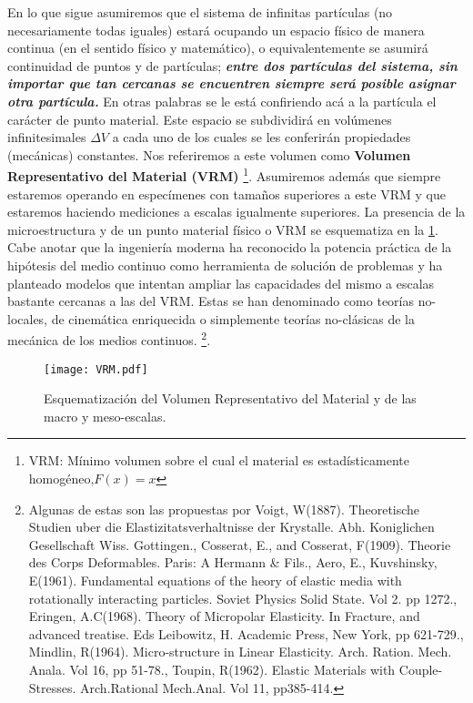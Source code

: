 \documentclass[../notas medios.tex]{subfiles}
\begin{document}
En lo que sigue asumiremos que el sistema de infinitas partículas (no
necesariamente todas iguales) estará ocupando un espacio físico de manera continua (en el sentido físico y matemático), o equivalentemente se asumirá continuidad de puntos y de partículas; \textbf{\textit{entre dos partículas del sistema, sin importar que tan cercanas se encuentren siempre será posible asignar otra partícula.}} En otras palabras se le está confiriendo acá a la partícula el carácter de punto material.  Este espacio se subdividirá en volúmenes infinitesimales $\Delta V$ a cada uno de los cuales se les conferirán propiedades (mecánicas) constantes.  Nos referiremos a este volumen como \textbf{Volumen Representativo del Material  (VRM)} \footnote{VRM: Mínimo volumen sobre el cual el material es estadísticamente homogéneo,$F(x)=x$}.  Asumiremos además que siempre estaremos operando en especímenes con tamaños superiores a este VRM y que estaremos haciendo mediciones a escalas igualmente superiores.  La presencia de la microestructura y de un punto material físico o VRM se esquematiza en la \cref{VRM}.  Cabe anotar que la ingeniería moderna ha reconocido la potencia práctica de la hipótesis del medio continuo como herramienta de solución de problemas y ha planteado modelos que intentan ampliar las capacidades del mismo a escalas bastante cercanas a las del VRM.  Estas se han denominado como teorías no-locales, de cinemática enriquecida o simplemente teorías no-clásicas de la mecánica de los medios continuos. \footnote{Algunas de estas son las propuestas por Voigt, W(1887).  Theoretische Studien uber die Elastizitatsverhaltnisse der Krystalle.  Abh. Koniglichen Gesellschaft Wiss.  Gottingen., Cosserat, E., and Cosserat, F(1909).  Theorie des Corps Deformables.  Paris: A Hermann \& Fils., Aero, E., Kuvshinsky, E(1961).  Fundamental equations of the heory of elastic media with rotationally interacting particles.  Soviet Physics Solid State.  Vol 2.  pp 1272., Eringen, A.C(1968).  Theory of Micropolar Elasticity.  In Fracture, and advanced treatise.  Eds Leibowitz, H.  Academic Press, New York, pp 621-729., Mindlin, R(1964).  Micro-structure in Linear Elasticity.  Arch. Ration. Mech. Anala.  Vol 16, pp 51-78., Toupin, R(1962).  Elastic Materials with Couple-Stresses.  Arch.Rational Mech.Anal.  Vol 11, pp385-414.}.

\begin{figure}[H]
\centering
	\texttt{[image: VRM.pdf]}
	\caption{Esquematización del Volumen Representativo del Material y de las macro y meso-escalas.}
	\label{VRM}
\end{figure}
\end{document}
